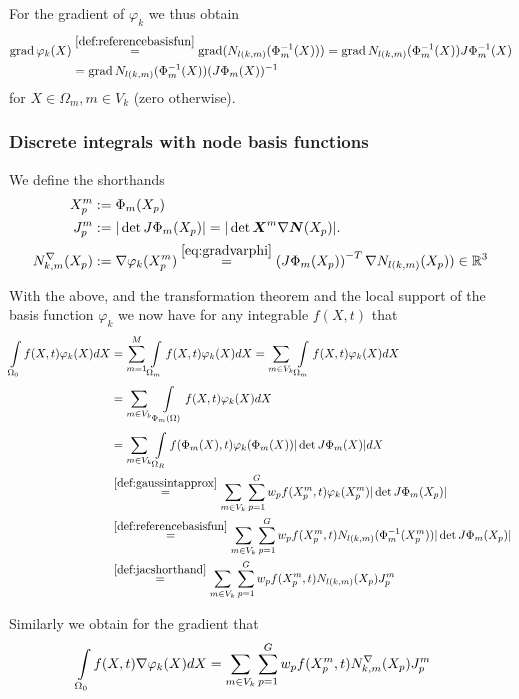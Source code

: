 For the gradient of $\varphi_k$ we thus obtain
\begin{align}
	\grad\varphi_k(X) &\re{def:referencebasisfun} \grad (N_{l(k,m)}(\Phi^{-1}_m(X)))
					  = \grad N_{l(k,m)}(\Phi^{-1}_m(X))J\Phi^{-1}_m(X)\nonumber\\
					  &= \grad N_{l(k,m)}(\Phi^{-1}_m(X))(J\Phi_m(X))^{-1}\label{eq:gradvarphi}
\end{align}
for $X\in\Omega_m, m\in V_k$ (zero otherwise).
 
\subsubsection{Discrete integrals with node basis functions}
We define the shorthands
\begin{align}
	\pmp &:= \Phi_m(X_p)\\
	\jmp &:= |\det J\Phi_m(X_p)| = |\det \vX^m\nabla\vN(X_p)|.\label{def:jacshorthand}\\
	\dNkmp &:= \nabla\varphi_k(\pmp) \re{eq:gradvarphi} \left(J\Phi_m(X_p)\right)^{-T}\nabla N_{l(k,m)}(X_p))\in\R^3\label{}
\end{align}

With the above, and the transformation theorem and the local support of the basis function $\varphi_k$ we now have for any integrable $f(X,t)$ that
\begin{align}
   \intl{\Or}{}f(X,t)\varphi_k(X)dX &= \suml{m=1}{M}\intl{\Omega_m}{}f(X,t)\varphi_k(X)dX = \sumvk\intl{\Omega_m}{}f(X,t)\varphi_k(X)dX\nonumber\\
    &= \sumvk\intl{\Phi_m(\Omega)}{}f(X,t)\varphi_k(X)dX\nonumber\\
	&= \sumvk\intl{\Om}{}f(\Phi_m(X),t)\varphi_k(\Phi_m(X))|\det J\Phi_m(X)|dX\nonumber\\
	& \re{def:gaussintapprox} \sumvk\sumgp w_pf(\pmp,t)\varphi_k(\pmp)|\det J\Phi_m(X_p)|\nonumber\\
	& \re{def:referencebasisfun} \sumvk\sumgp w_pf(\pmp,t)N_{l(k,m)}(\Phi_m^{-1}(\pmp))|\det J\Phi_m(X_p)|\nonumber\\
	& \re{def:jacshorthand} \sumvk\sumgp w_pf(\pmp,t)N_{l(k,m)}(X_p)\jmp\label{eq:fphidx}
\end{align}

Similarly we obtain for the gradient that
\begin{align}
	\int\limits_{\Omega_0}^{}f(X,t)\nabla\varphi_k(X)dX &= \sum\limits_{m\in V_k}^{}\sum\limits_{p=1}^{G} w_pf(X^m_p,t)N^\nabla_{k,m}(X_p)J^m_p\label{eq:fgradphidx}
\end{align}